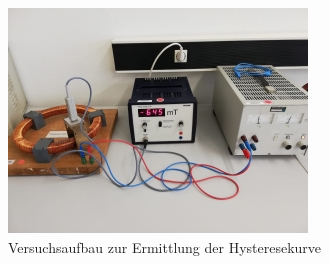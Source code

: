\begin{figure}[H]
    \centering
    \includegraphics{content/Ringspule.jpg}
    \caption{Versuchsaufbau zur Ermittlung der Hysteresekurve}
    \label{Ringspule}
\end{figure}